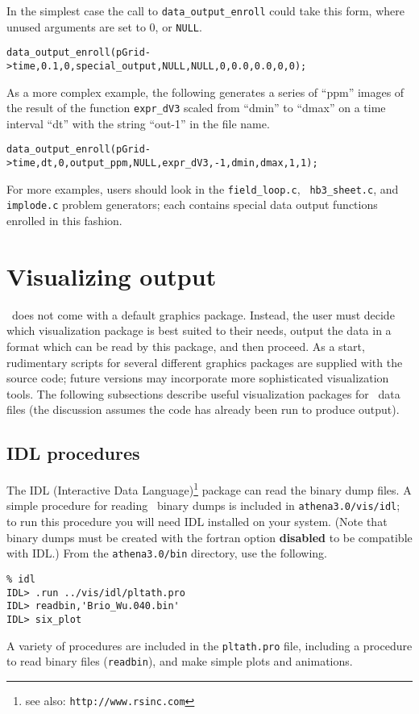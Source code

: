 In the simplest case the call to {\tt data\_output\_enroll} could take 
this form, where unused arguments are set to 0, or {\tt NULL}.
\footnotesize
\begin{verbatim}
data_output_enroll(pGrid->time,0.1,0,special_output,NULL,NULL,0,0.0,0.0,0,0);
\end{verbatim}
\normalsize
As a more complex example, the following generates a series of ``ppm''
images of the result of the function {\tt expr\_dV3} scaled from
``dmin'' to ``dmax'' on a time interval ``dt'' with the string
``out-1'' in the file name.
\footnotesize
\begin{verbatim}
data_output_enroll(pGrid->time,dt,0,output_ppm,NULL,expr_dV3,-1,dmin,dmax,1,1);
\end{verbatim}
\normalsize
For more examples, users should look in the {\tt field\_loop.c}, {\tt
hb3\_sheet.c}, and {\tt implode.c} problem generators; each contains
special data output functions enrolled in this fashion.

\section{Visualizing output}

\ath\ does not come with a default graphics package.  Instead, the user must
decide which visualization package is best suited to their needs, output the
data in a format which can be read by this package, and then proceed.
As a start, rudimentary
scripts for several different graphics packages are supplied with the source
code; future versions may incorporate more sophisticated visualization
tools.  The following subsections describe useful visualization packages for
\ath\ data files (the discussion assumes the code has already been run to
produce output).

\subsection{IDL procedures}

The IDL (Interactive Data Language)\footnote{see also: {\tt http://www.rsinc.com}} package
can read the binary dump files.  A simple procedure for reading \ath\ binary
dumps is included in {\tt athena3.0/vis/idl}; to run this procedure you will need
IDL installed on your system.  (Note that binary dumps must be created
with the fortran option {\bf disabled} to be compatible with IDL.)
From the {\tt athena3.0/bin} directory, use the following.
\footnotesize
\begin{verbatim}
% idl
IDL> .run ../vis/idl/pltath.pro 
IDL> readbin,'Brio_Wu.040.bin'
IDL> six_plot
\end{verbatim}
\normalsize
A variety of procedures are included in the {\tt pltath.pro} file, including 
a procedure to read binary files ({\tt readbin}), and make simple plots 
and animations.

